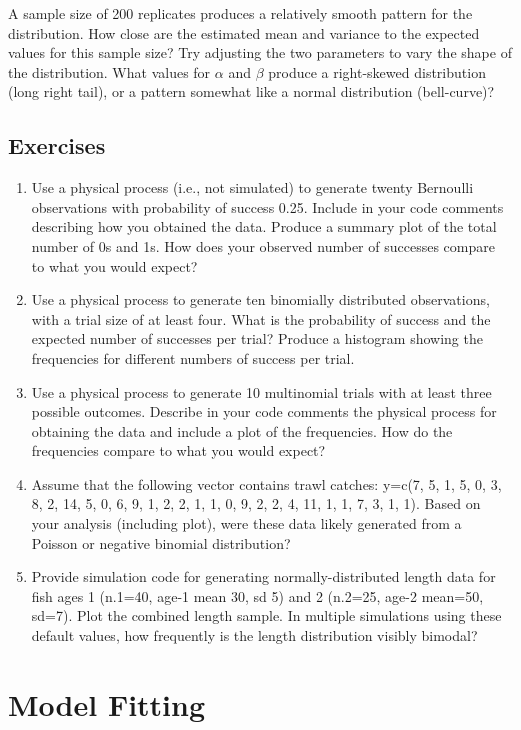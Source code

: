 \documentclass[
]{krantz}
\begin{document}
A sample size of 200 replicates produces a relatively smooth pattern for the distribution. How close are the estimated mean and variance to the expected values for this sample size? Try adjusting the two parameters to vary the shape of the distribution. What values for \(\alpha\) and \(\beta\) produce a right-skewed distribution (long right tail), or a pattern somewhat like a normal distribution (bell-curve)?

\hypertarget{exercises}{%
\section{Exercises}\label{exercises}}

\begin{enumerate}
\def\labelenumi{\arabic{enumi}.}
\item
  Use a physical process (i.e., not simulated) to generate twenty Bernoulli observations with probability of success 0.25. Include in your code comments describing how you obtained the data. Produce a summary plot of the total number of 0s and 1s. How does your observed number of successes compare to what you would expect?
\item
  Use a physical process to generate ten binomially distributed observations, with a trial size of at least four. What is the probability of success and the expected number of successes per trial? Produce a histogram showing the frequencies for different numbers of success per trial.
\item
  Use a physical process to generate 10 multinomial trials with at least three possible outcomes. Describe in your code comments the physical process for obtaining the data and include a plot of the frequencies. How do the frequencies compare to what you would expect?
\item
  Assume that the following vector contains trawl catches: y=c(7, 5, 1, 5, 0, 3, 8, 2, 14, 5, 0, 6, 9, 1, 2, 2, 1, 1, 0, 9, 2, 2, 4, 11, 1, 1, 7, 3, 1, 1). Based on your analysis (including plot), were these data likely generated from a Poisson or negative binomial distribution?
\item
  Provide simulation code for generating normally-distributed length data for fish ages 1 (n.1=40, age-1 mean 30, sd 5) and 2 (n.2=25, age-2 mean=50, sd=7). Plot the combined length sample. In multiple simulations using these default values, how frequently is the length distribution visibly bimodal?
\end{enumerate}

\hypertarget{Model-fit}{%
\chapter{Model Fitting}\label{Model-fit}}
\end{document}
